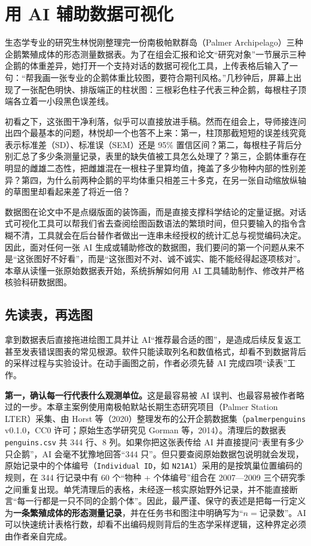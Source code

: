 \chapter{用 AI 辅助数据可视化}

生态学专业的研究生林悦刚整理完一份南极帕默群岛（Palmer Archipelago）三种企鹅繁殖成体的形态测量数据表。为了在组会汇报和论文“研究对象”一节展示三种企鹅的体重差异，她打开一个支持对话的数据可视化工具，上传表格后输入了一句：“帮我画一张专业的企鹅体重比较图，要符合期刊风格。”几秒钟后，屏幕上出现了一张配色明快、排版端正的柱状图：三根彩色柱子代表三种企鹅，每根柱子顶端各立着一小段黑色误差线。

初看之下，这张图干净利落，似乎可以直接放进手稿。然而在组会上，导师接连问出四个最基本的问题，林悦却一个也答不上来：第一，柱顶那截短短的误差线究竟表示标准差（SD）、标准误（SEM）还是 95\% 置信区间？第二，每根柱子背后分别汇总了多少条测量记录，表里的缺失值被工具怎么处理了？第三，企鹅体重存在明显的雌雄二态性，把雌雄混在一根柱子里算均值，掩盖了多少物种内部的性别差异？第四，为什么前两种企鹅的平均体重只相差三十多克，在另一张自动缩放纵轴的草图里却看起来差了将近一倍？

数据图在论文中不是点缀版面的装饰画，而是直接支撑科学结论的定量证据。对话式可视化工具可以帮我们省去查阅绘图函数语法的繁琐时间，但只要输入的指令含糊不清，工具就会在后台替作者做出一连串未经授权的统计汇总与视觉编码决定。因此，面对任何一张 AI 生成或辅助修改的数据图，我们要问的第一个问题从来不是“这张图好不好看”，而是“这张图对不对、诚不诚实、能不能经得起逐项核对”。本章从读懂一张原始数据表开始，系统拆解如何用 AI 工具辅助制作、修改并严格核验科研数据图。

\section{先读表，再选图}

拿到数据表后直接拖进绘图工具并让 AI“推荐最合适的图”，是造成后续反复返工甚至发表错误图表的常见根源。软件只能读取列名和数值格式，却看不到数据背后的采样过程与实验设计。在动手画图之前，作者必须先替 AI 完成四项“读表”工作。

\textbf{第一，确认每一行代表什么观测单位。}这是最容易被 AI 误判、也最容易被作者略过的一步。本章主案例使用南极帕默站长期生态研究项目（Palmer Station LTER）采集、由 Horst 等（2020）整理发布的公开企鹅数据集（\texttt{palmerpenguins} v0.1.0，CC0 许可；原始生态学研究见 Gorman 等，2014）。清理后的数据表 \texttt{penguins.csv} 共 344 行、8 列。如果你把这张表传给 AI 并直接提问“表里有多少只企鹅”，AI 会毫不犹豫地回答“344 只”。但只要查阅原始数据包说明就会发现，原始记录中的个体编号（\texttt{Individual ID}，如 \texttt{N21A1}）采用的是按筑巢位置编码的规则，在 344 行记录中有 60 个“物种 + 个体编号”组合在 2007—2009 三个研究季之间重复出现。单凭清理后的表格，未经逐一核实原始野外记录，并不能直接断言“每一行都是一只不同的企鹅个体”。因此，最严谨、保守的表述是把每一行定义为\textbf{一条繁殖成体的形态测量记录}，并在任务书和图注中明确写为“$n = \text{记录数}$”。AI 可以快速统计表格行数，却看不出编码规则背后的生态学采样逻辑，这种界定必须由作者亲自完成。

